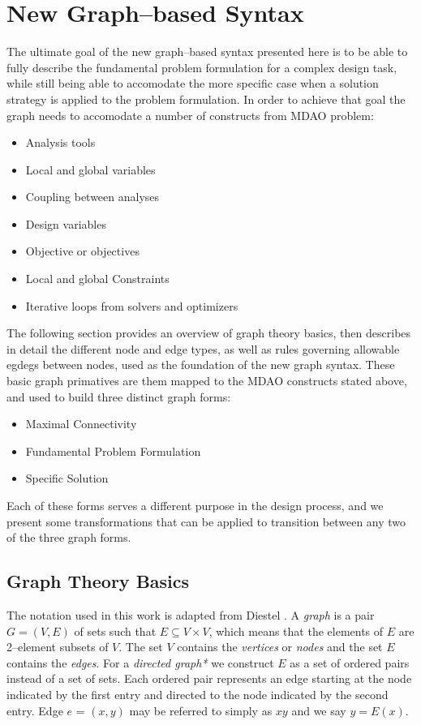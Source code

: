 \section{New Graph--based Syntax}
The ultimate goal of the new graph--based syntax presented here is to be able to 
fully describe the fundamental problem formulation for a complex design task, 
while still being able to accomodate the more specific case when a solution 
strategy is applied to the problem formulation. In order to achieve that goal 
the graph needs to accomodate a number of constructs from MDAO problem: 

\begin{itemize}
    \item Analysis tools 
    \item Local and global variables 
    \item Coupling between analyses
    \item Design variables
    \item Objective or objectives 
    \item Local and global Constraints
    \item Iterative loops from solvers and optimizers
\end{itemize}

The following section provides an overview of graph theory basics, then describes 
in detail the different node and edge types, as well as rules governing allowable 
egdegs between nodes, used as the foundation of the new graph syntax. These basic graph 
primatives are them mapped to the MDAO constructs stated above, and used to 
build three distinct graph forms: 

\begin{itemize}
    \item Maximal Connectivity
    \item Fundamental Problem Formulation 
    \item Specific Solution
\end{itemize}

Each of these forms serves a different purpose in the design process, and we 
present some transformations that can be applied to transition 
between any two of the three graph forms. 

\subsection{Graph Theory Basics}
The notation used in this work is adapted from Diestel \cite{Diestel2010}. 
A \emph{graph} is a pair $G = (V,E)$ of sets such that $E \subseteq V \times V$, 
which means that the elements of $E$ are 2--element subsets of $V$. The set $V$ 
contains the \emph{vertices} or \emph{nodes} and the set $E$ contains the \emph{edges}.
For a \emph{directed graph*} we construct $E$ as a set of ordered pairs instead 
of a set of sets. Each ordered pair represents an edge starting at the node 
indicated by the first entry and directed to the node indicated by the second 
entry. Edge $e$ = $(x,y)$ may be referred to simply as $xy$ and we say $y = E(x)$. 

